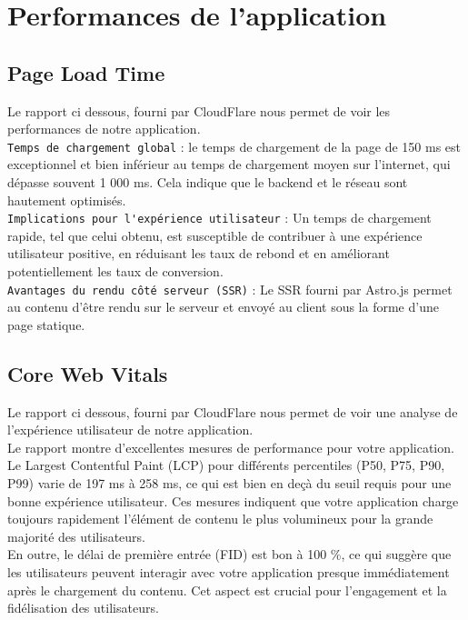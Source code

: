 \documentclass[12pt, a4paper, oneside]{article}
\begin{document}
\newpage
\section{Performances de l'application}

\subsection{Page Load Time}

Le rapport ci dessous, fourni par CloudFlare nous permet de voir les performances de notre application.\\

\verb|Temps de chargement global| : le temps de chargement de la page de 150 ms est exceptionnel et bien inférieur au temps de chargement moyen sur l'internet, qui dépasse souvent 1 000 ms. Cela indique que le backend et le réseau sont hautement optimisés.\\

\verb|Implications pour l'expérience utilisateur| : Un temps de chargement rapide, tel que celui obtenu, est susceptible de contribuer à une expérience utilisateur positive, en réduisant les taux de rebond et en améliorant potentiellement les taux de conversion.\\
\verb|Avantages du rendu côté serveur (SSR)| : Le SSR fourni par Astro.js permet au contenu d'être rendu sur le serveur et envoyé au client sous la forme d'une page statique.\\

\subsection{Core Web Vitals}

Le rapport ci dessous, fourni par CloudFlare nous permet de voir une analyse de l'expérience utilisateur de notre application.\\

Le rapport montre d'excellentes mesures de performance pour votre application. Le Largest Contentful Paint (LCP) pour différents percentiles (P50, P75, P90, P99) varie de 197 ms à 258 ms, ce qui est bien en deçà du seuil requis pour une bonne expérience utilisateur. Ces mesures indiquent que votre application charge toujours rapidement l'élément de contenu le plus volumineux pour la grande majorité des utilisateurs.\\

En outre, le délai de première entrée (FID) est bon à 100 \%, ce qui suggère que les utilisateurs peuvent interagir avec votre application presque immédiatement après le chargement du contenu. Cet aspect est crucial pour l'engagement et la fidélisation des utilisateurs.\\
\end{document}
